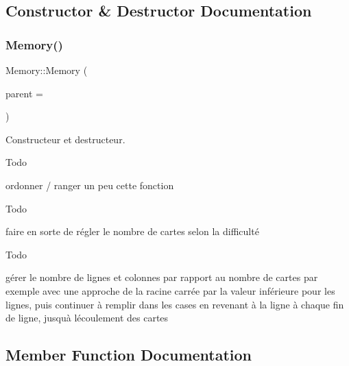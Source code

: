 \subsection{Constructor \& Destructor Documentation}
\mbox{\label{class_memory_a243eef3e0fd8d02131e3bcca0471c931}} 
\subsubsection{\texorpdfstring{Memory()}{Memory()}}
{\footnotesize\ttfamily Memory\+::\+Memory (\begin{DoxyParamCaption}\item[{Q\+Widget $\ast$}]{parent = {} }\end{DoxyParamCaption})\hspace{0.3cm}{\ttfamily [explicit]}}



Constructeur et destructeur. 

\begin{DoxyRefDesc}{Todo}
\item[\hyperlink{todo__todo000001}{Todo}]ordonner / ranger un peu cette fonction \end{DoxyRefDesc}


\begin{DoxyRefDesc}{Todo}
\item[\hyperlink{todo__todo000002}{Todo}]faire en sorte de régler le nombre de cartes selon la difficulté \end{DoxyRefDesc}


\begin{DoxyRefDesc}{Todo}
\item[\hyperlink{todo__todo000003}{Todo}]gérer le nombre de lignes et colonnes par rapport au nombre de cartes par exemple avec une approche de la racine carrée par la valeur inférieure pour les lignes, puis continuer à remplir dans les cases en revenant à la ligne à chaque fin de ligne, jusqu\textquotesingle{}à l\textquotesingle{}écoulement des cartes \end{DoxyRefDesc}


\subsection{Member Function Documentation}
\mbox{\label{class_memory_a7c8b57775899a3782edcdf4da430ad61}} 
